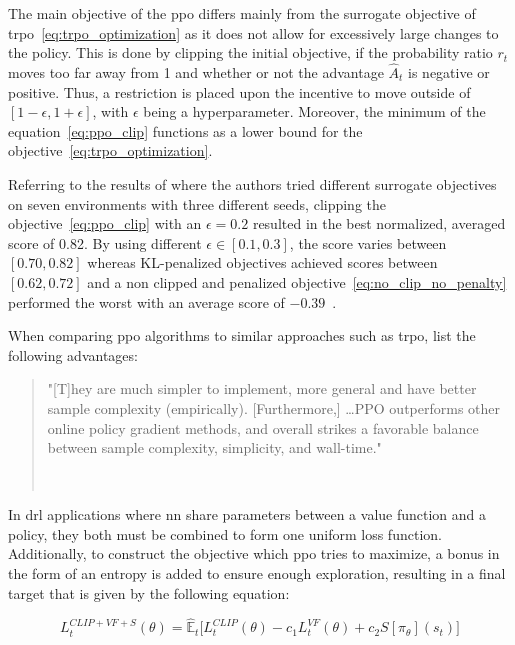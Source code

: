 \documentclass[draft,final]{vutinfth} %
\newcommand{\p}[1]{see p. #1}
\begin{document}
    The main objective of the \gls{ppo} differs mainly from the surrogate objective of \gls{trpo}~\eqref{eq:trpo_optimization} as it does not allow for excessively large changes to the policy.
    This is done by clipping the initial objective, if the probability ratio $r_t$ moves too far away from 1 and whether or not the advantage $\hat{A}_t$ is negative or positive.
    Thus, a restriction is placed upon the incentive to move outside of $[1-\epsilon,1+\epsilon]$, with $\epsilon$ being a hyperparameter.
    Moreover, the minimum of the equation~\ref{eq:ppo_clip} functions as a lower bound for the objective~\ref{eq:trpo_optimization}.

    Referring to the results of \citeauthor{francois-lavet_introduction_2018} where the authors tried different surrogate objectives on seven environments with three different seeds, clipping the objective~\eqref{eq:ppo_clip} with an $\epsilon=0.2$ resulted in the best normalized, averaged score of 0.82.
    By using different $\epsilon \in [0.1,0.3]$, the score varies between $[0.70,0.82]$ whereas KL-penalized objectives achieved scores between $[0.62,0.72]$ and a non clipped and penalized objective~\eqref{eq:no_clip_no_penalty} performed the worst with an average score of $-0.39$~\citep[see Table 1]{francois-lavet_introduction_2018}.

    When comparing \gls{ppo} algorithms to similar approaches such as \gls{trpo}, \citeauthor{francois-lavet_introduction_2018} list the following advantages:

    \begin{quote}
        "[T]hey are much simpler to implement, more general and have better sample complexity (empirically). [Furthermore,] \ldots PPO outperforms other online policy gradient methods, and overall strikes a favorable balance between sample complexity, simplicity, and wall-time."

        \hfill ~\citep[\p{1}]{francois-lavet_introduction_2018}
    \end{quote}

    In \gls{drl} applications where \gls{nn} share parameters between a value function and a policy, they both must be combined to form one uniform loss function.
    Additionally, to construct the objective which \gls{ppo} tries to maximize, a bonus in the form of an entropy is added to ensure enough exploration, resulting in a final target that is given by the following equation:

    \begin{equation}
        L_t^{CLIP+VF+S}(\theta) = \hat{\mathbb{E}}_t\bigg[L_t^{CLIP}(\theta) - c_1L_t^{VF}(\theta) + c_2S[\pi_\theta](s_t)\bigg]\label{eq:ppo_objective}
    \end{equation}
\end{document}
